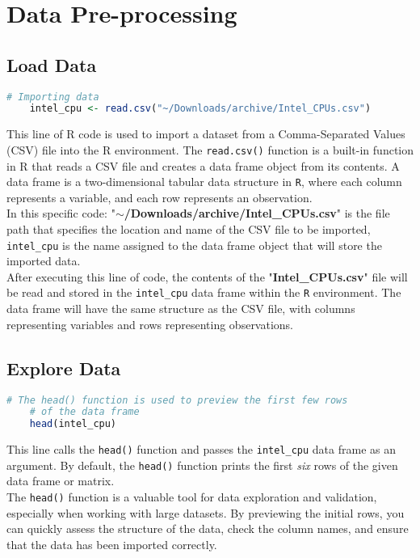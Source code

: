 \section{Data Pre-processing}
\subsection{Load Data}
\begin{lstlisting}[language=R]
    # Importing data 
    intel_cpu <- read.csv("~/Downloads/archive/Intel_CPUs.csv")
\end{lstlisting}

This line of R code is used to import a dataset from a Comma-Separated Values (CSV) file into the R environment.
The \texttt{read.csv()} function is a built-in function in R that reads a CSV file and creates a data frame object from its contents. A data frame is a two-dimensional tabular data structure in \texttt{R}, where each column represents a variable, and each row represents an observation.\\

In this specific code:
"\textbf{$\sim$/Downloads/archive/Intel\_CPUs.csv}" is the file path that specifies the location and name of the CSV file to be imported, \texttt{intel\_cpu} is the name assigned to the data frame object that will store the imported data.\\

After executing this line of code, the contents of the "\textbf{Intel\_CPUs.csv}" file will be read and stored in the \texttt{intel\_cpu} data frame within the \texttt{R} environment. The data frame will have the same structure as the CSV file, with columns representing variables and rows representing observations.

\subsection{Explore Data}
\begin{lstlisting}[language=R]
    # The head() function is used to preview the first few rows 
    # of the data frame
    head(intel_cpu)
\end{lstlisting}

This line calls the \texttt{head()} function and passes the \texttt{intel\_cpu} data frame as an argument. By default, the \texttt{head()} function prints the first \textit{six} rows of the given data frame or matrix.\\

The \texttt{head()} function is a valuable tool for data exploration and validation, especially when working with large datasets. By previewing the initial rows, you can quickly assess the structure of the data, check the column names, and ensure that the data has been imported correctly.\\

